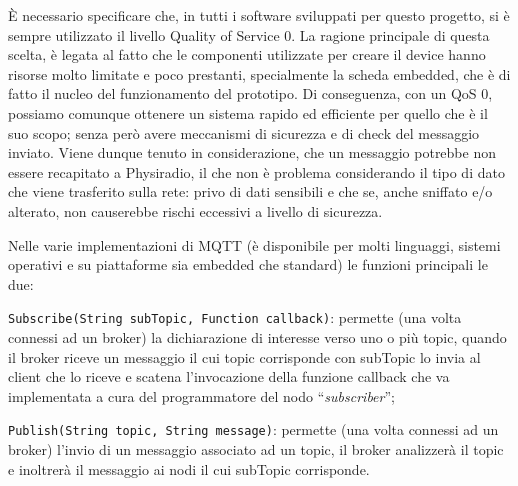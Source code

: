 \documentclass[12pt,a4paper]{report}
\newcommand{\physiradio}{Physiradio} %
\begin{document}
\medskip

È necessario specificare che, in tutti i software sviluppati per questo progetto, si è sempre utilizzato il livello Quality of Service 0. 
La ragione principale di questa scelta, è legata al fatto che le componenti utilizzate per creare il device hanno risorse molto limitate e poco prestanti, specialmente la scheda embedded, che è di fatto il nucleo del funzionamento del prototipo. Di conseguenza, con un QoS 0, possiamo comunque ottenere un sistema rapido ed efficiente per quello che è il suo scopo; senza però avere meccanismi di sicurezza e di check del messaggio inviato. Viene dunque tenuto in considerazione, che un messaggio potrebbe non essere recapitato a \physiradio, il che non è problema considerando il tipo di dato che viene trasferito sulla rete: privo di dati sensibili e che se, anche sniffato e/o alterato, non causerebbe rischi eccessivi a livello di sicurezza. \\

\medskip 

Nelle varie implementazioni di MQTT (è disponibile per molti linguaggi, sistemi operativi e su piattaforme sia embedded che standard) le funzioni principali le due:


\begin{compactitem}
\item \texttt{Subscribe(String subTopic, Function callback)}: permette (una volta connessi ad un broker) la dichiarazione di interesse verso uno o più topic, quando il broker riceve un messaggio il cui topic corrisponde con subTopic lo invia al client che lo riceve e scatena l’invocazione della funzione callback che va implementata a cura del programmatore del nodo “\textit{subscriber}”;
\item \texttt{Publish(String topic, String message)}: permette (una volta connessi ad un broker) l’invio di un messaggio associato ad un topic, il broker analizzerà il topic e inoltrerà il messaggio ai nodi il cui subTopic corrisponde.
\end{compactitem}

\medskip
\end{document}
